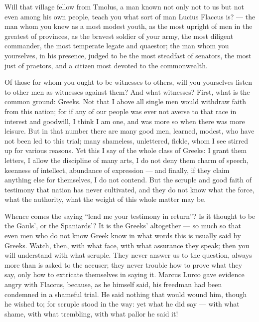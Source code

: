  Will that village fellow from Tmolus, a man known not only not to us but not even among his own people, teach you what sort of man Lucius Flaccus is? --- the man whom you knew as a most modest youth, as the most upright of men in the greatest of provinces, as the bravest soldier of your army, the most diligent commander, the most temperate legate and quaestor; the man whom you yourselves, in his presence, judged to be the most steadfast of senators, the most just of praetors, and a citizen most devoted to the commonwealth.

 Of those for whom you ought to be witnesses to others, will you yourselves listen to other men as witnesses against them? And what witnesses? First, what is the common ground: Greeks. Not that I above all single men would withdraw faith from this nation; for if any of our people was ever not averse to that race in interest and goodwill, I think I am one, and was more so when there was more leisure. But in that number there are many good men, learned, modest, who have not been led to this trial; many shameless, unlettered, fickle, whom I see stirred up for various reasons. Yet this I say of the whole class of Greeks: I grant them letters, I allow the discipline of many arts, I do not deny them charm of speech, keenness of intellect, abundance of expression --- and finally, if they claim anything else for themselves, I do not contend. But the scruple and good faith of testimony that nation has never cultivated, and they do not know what the force, what the authority, what the weight of this whole matter may be.

 Whence comes the saying ``lend me your testimony in return''? Is it thought to be the Gauls', or the Spaniards'? It is the Greeks' altogether --- so much so that even men who do not know Greek know in what words this is usually said by Greeks. Watch, then, with what face, with what assurance they speak; then you will understand with what scruple. They never answer us to the question, always more than is asked to the accuser; they never trouble how to prove what they say, only how to extricate themselves in saying it. Marcus Lurco gave evidence angry with Flaccus, because, as he himself said, his freedman had been condemned in a shameful trial. He said nothing that would wound him, though he wished to; for scruple stood in the way: yet what he did say --- with what shame, with what trembling, with what pallor he said it!

